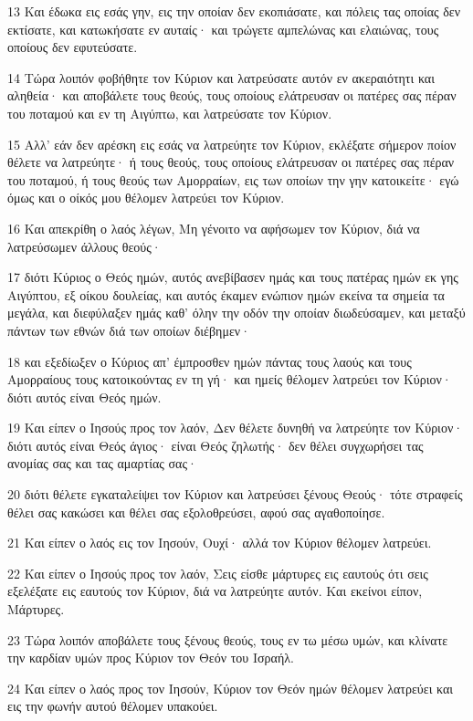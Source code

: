 \par 13 Και έδωκα εις εσάς γην, εις την οποίαν δεν εκοπιάσατε, και πόλεις τας οποίας δεν εκτίσατε, και κατωκήσατε εν αυταίς· και τρώγετε αμπελώνας και ελαιώνας, τους οποίους δεν εφυτεύσατε.
\par 14 Τώρα λοιπόν φοβήθητε τον Κύριον και λατρεύσατε αυτόν εν ακεραιότητι και αληθεία· και αποβάλετε τους θεούς, τους οποίους ελάτρευσαν οι πατέρες σας πέραν του ποταμού και εν τη Αιγύπτω, και λατρεύσατε τον Κύριον.
\par 15 Αλλ' εάν δεν αρέσκη εις εσάς να λατρεύητε τον Κύριον, εκλέξατε σήμερον ποίον θέλετε να λατρεύητε· ή τους θεούς, τους οποίους ελάτρευσαν οι πατέρες σας πέραν του ποταμού, ή τους θεούς των Αμορραίων, εις των οποίων την γην κατοικείτε· εγώ όμως και ο οίκός μου θέλομεν λατρεύει τον Κύριον.
\par 16 Και απεκρίθη ο λαός λέγων, Μη γένοιτο να αφήσωμεν τον Κύριον, διά να λατρεύσωμεν άλλους θεούς·
\par 17 διότι Κύριος ο Θεός ημών, αυτός ανεβίβασεν ημάς και τους πατέρας ημών εκ γης Αιγύπτου, εξ οίκου δουλείας, και αυτός έκαμεν ενώπιον ημών εκείνα τα σημεία τα μεγάλα, και διεφύλαξεν ημάς καθ' όλην την οδόν την οποίαν διωδεύσαμεν, και μεταξύ πάντων των εθνών διά των οποίων διέβημεν·
\par 18 και εξεδίωξεν ο Κύριος απ' έμπροσθεν ημών πάντας τους λαούς και τους Αμορραίους τους κατοικούντας εν τη γή· και ημείς θέλομεν λατρεύει τον Κύριον· διότι αυτός είναι Θεός ημών.
\par 19 Και είπεν ο Ιησούς προς τον λαόν, Δεν θέλετε δυνηθή να λατρεύητε τον Κύριον· διότι αυτός είναι Θεός άγιος· είναι Θεός ζηλωτής· δεν θέλει συγχωρήσει τας ανομίας σας και τας αμαρτίας σας·
\par 20 διότι θέλετε εγκαταλείψει τον Κύριον και λατρεύσει ξένους Θεούς· τότε στραφείς θέλει σας κακώσει και θέλει σας εξολοθρεύσει, αφού σας αγαθοποίησε.
\par 21 Και είπεν ο λαός εις τον Ιησούν, Ουχί· αλλά τον Κύριον θέλομεν λατρεύει.
\par 22 Και είπεν ο Ιησούς προς τον λαόν, Σεις είσθε μάρτυρες εις εαυτούς ότι σεις εξελέξατε εις εαυτούς τον Κύριον, διά να λατρεύητε αυτόν. Και εκείνοι είπον, Μάρτυρες.
\par 23 Τώρα λοιπόν αποβάλετε τους ξένους θεούς, τους εν τω μέσω υμών, και κλίνατε την καρδίαν υμών προς Κύριον τον Θεόν του Ισραήλ.
\par 24 Και είπεν ο λαός προς τον Ιησούν, Κύριον τον Θεόν ημών θέλομεν λατρεύει και εις την φωνήν αυτού θέλομεν υπακούει.
